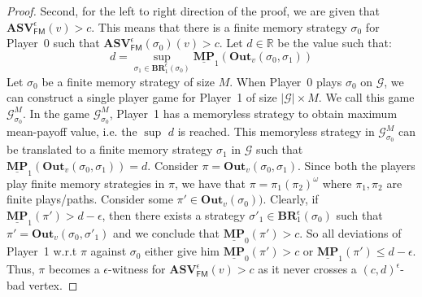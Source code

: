 \begin{proof}
	Second, for the left to right direction of the proof, we are given that $\mathbf{ASV}_{\mathsf{FM}}^{\epsilon}(v) > c$. This means that there is a finite memory strategy $\sigma_0$ for Player~0 such that $\mathbf{ASV}_{\mathsf{FM}}^{\epsilon}(\sigma_0)(v) > c$. Let $d \in \mathbb{R}$ be the value such that:
	\begin{equation*}
	    d = \sup\limits_{\sigma_1 \in \mathbf{BR}_1^{\epsilon}(\sigma_0)} \underline{\mathbf{MP}}_1(\mathbf{Out}_v(\sigma_0, \sigma_1))
	\end{equation*}
	Let $\sigma_0$ be a finite memory strategy of size $M$. When Player~0 plays $\sigma_0$ on $\mathcal{G}$, we can construct a single player game for Player~1 of size $|\mathcal{G}|\times M$. We call this game $\mathcal{G}^M_{\sigma_0}$. In the game $\mathcal{G}^M_{\sigma_0}$, Player~1 has a memoryless strategy to obtain maximum mean-payoff value, i.e. the $\sup$ $d$ is reached. This memoryless strategy in $\mathcal{G}^M_{\sigma_0}$ can be translated to a finite memory strategy $\sigma_1$ in $\mathcal{G}$ such that $\underline{\mathbf{MP}}_1(\mathbf{Out}_v(\sigma_0, \sigma_1)) = d$.
	Consider $\pi = \mathbf{Out}_v(\sigma_0, \sigma_1)$. Since both the players play finite memory strategies in $\pi$, we have that $\pi = \pi_1(\pi_2)^{\omega}$ where $\pi_1, \pi_2$ are finite plays/paths. Consider some $\pi' \in \mathbf{Out}_v(\sigma_0))$. Clearly, if $\underline{\mathbf{MP}}_1(\pi') > d-\epsilon$, then there exists a strategy $\sigma'_1 \in \mathbf{BR}_1^{\epsilon}(\sigma_0)$ such that $\pi' = \mathbf{Out}_v(\sigma_0, \sigma'_1)$ and we conclude that $\underline{\mathbf{MP}}_0(\pi') > c$. So all deviations of Player~1 w.r.t $\pi$ against $\sigma_0$ either give him $\underline{\mathbf{MP}}_0(\pi') > c$ or $\underline{\mathbf{MP}}_1(\pi') \leqslant d-\epsilon$. Thus, $\pi$ becomes a $\epsilon$-witness for $\mathbf{ASV}_{\mathsf{FM}}^{\epsilon}(v) > c$ as it never crosses a $(c,d)^{\epsilon}$-bad vertex.
\end{proof}